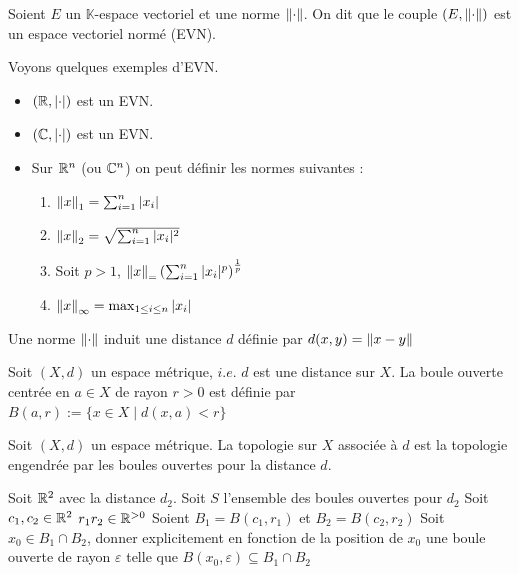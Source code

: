\begin{definition}
    Soient $E$ un $\mathbb{K}$-espace vectoriel et une norme $\left\| \cdot \right\|$. On dit que le couple $(E,\left\| \cdot \right\|)$ est un espace vectoriel normé (EVN).
\end{definition}
\begin{exemple} 
Voyons quelques exemples d'EVN.
    \begin{itemize}
        \item $(\mathbb{R},\left| \cdot \right|)$ est un EVN.
        \item $(\mathbb{C},\left| \cdot \right|)$ est un EVN.
        \item Sur $\mathbb{R}^n$ (ou $\mathbb{C}^n$) on peut définir les normes suivantes :
        \begin{enumerate}
            \item $\left\| x \right\|_1=\sum_{i=1}^n|x_i|$
            \item $\left\| x \right\|_2=\sqrt{\sum_{i=1}^n|x_i|^2}$
            \item Soit $p>1$, $\left\| x \right\|_=\left(\sum_{i=1}^n|x_i|^p\right)^{\frac 1 p}$
            \item $\left\| x \right\|_\infty=\max_{1\leq i\leq n}|x_i|$
        \end{enumerate}
    \end{itemize}
\end{exemple}
\begin{remarque}
    Une norme $\left\| \cdot \right\|$ induit une distance $d$ définie par $d(x,y) = \left\| x-y \right\|$
\end{remarque}
\begin{definition}
   Soit $(X,d)$ un espace métrique, $\textit{i.e.}$ $d$ est une distance sur $X$. La boule ouverte centrée en $a\in X$ de rayon $r>0$ est définie par $B(a,r):=\{x\in X\mid d(x,a)<r\}$
\end{definition}
\begin{definition}
    Soit $(X,d)$ un espace métrique. La topologie sur $X$ associée à $d$ est la topologie engendrée par les boules ouvertes pour la distance $d$.
\end{definition}
\begin{proposition}
    Soit $\mathbb{R}^2$ avec la distance $d_2$. Soit $S$ l'ensemble des boules ouvertes pour $d_2$
    Soit $c_1,c_2\in \mathbb{R}^2$ $r_1r_2\in \mathbb{R}^{>0}$ Soient $B_1=B(c_1,r_1)$ et $B_2=B(c_2,r_2)$ Soit $x_0\in B_1\cap B_2$, donner explicitement en fonction de la position de $x_0$ une boule ouverte de rayon $\varepsilon$ telle que $B(x_0,\varepsilon)\subseteq B_1\cap B_2$
\end{proposition}
